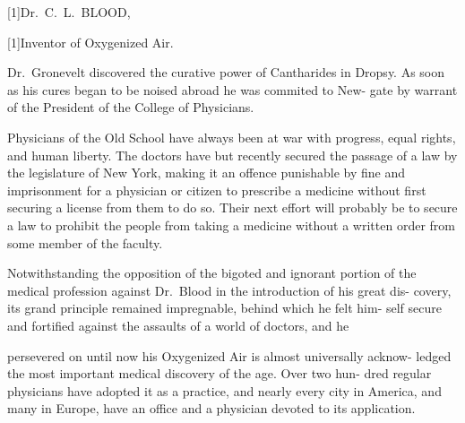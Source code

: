 \documentclass[10pt]{article}
\begin{document}
\begin{multicols}{3}
\begin{centering}
		\Large\scalebox{1.1}[1]{Dr.~C.~L.~BLOOD,}

		\vspace{2.5mm}

		\large\scalebox{1.2}[1]{Inventor of Oxygenized Air.}

	\end{centering}

	\vspace{2.75mm}

	Dr.~Gronevelt discovered the curative power of Cantharides in Dropsy.\linebreak
	As soon as his cures began to be noised abroad he was commited to New-\linebreak
	gate by warrant of the President of the College of Physicians.

	Physicians of the Old School have always been at war with progress,\linebreak
	equal rights, and human liberty. The doctors have but recently secured\linebreak
	the passage of a law by the legislature of New York, making it an offence\linebreak
	punishable by fine and imprisonment for a physician or citizen to prescribe\linebreak
	a medicine without first securing a license from them to do so. Their next\linebreak
	effort will probably be to secure a law to prohibit the people from taking a\linebreak
	medicine without a written order from some member of the faculty.

	Notwithstanding the opposition of the bigoted and ignorant portion of\linebreak
	the medical profession against Dr.~Blood in the introduction of his great dis-\linebreak
	covery, its grand principle remained impregnable, behind which he felt him-\linebreak
	self secure and fortified against the assaults of a world of doctors, and he\linebreak

	\vfill

	\noindent persevered on until now his Oxygenized Air is almost universally acknow-\linebreak
	ledged the most important medical discovery of the age. Over two hun-\linebreak
	dred regular physicians have adopted it as a practice, and nearly every city\linebreak
	in America, and many in Europe, have an office and a physician devoted\linebreak
	to its application.


\end{multicols}
\end{document}
